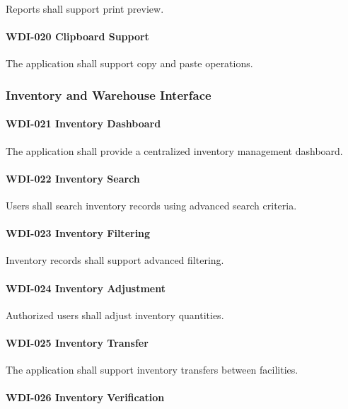 Reports shall support print preview.

\paragraph{WDI-020 Clipboard Support}

The application shall support copy and paste operations.


\subsubsection*{Inventory and Warehouse Interface}

\paragraph{WDI-021 Inventory Dashboard}

The application shall provide a centralized inventory management
dashboard.

\paragraph{WDI-022 Inventory Search}

Users shall search inventory records using advanced search criteria.

\paragraph{WDI-023 Inventory Filtering}

Inventory records shall support advanced filtering.

\paragraph{WDI-024 Inventory Adjustment}

Authorized users shall adjust inventory quantities.

\paragraph{WDI-025 Inventory Transfer}

The application shall support inventory transfers between facilities.

\paragraph{WDI-026 Inventory Verification}

